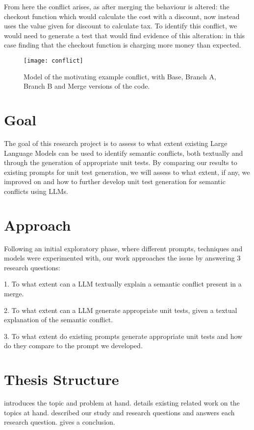 From here the conflict arises, as after merging the behaviour is altered: the checkout function which would calculate the cost with a discount, now instead uses the value given for discount to calculate tax. To identify this conflict, we would need to generate a test that would find evidence of this alteration: in this case finding that the checkout function is charging more money than expected.

\begin{figure}[t]
    \texttt{[image: conflict]}
    \caption{Model of the motivating example conflict, with Base, Branch A, Branch B and Merge versions of the code.}
    \label{fig:conflict}
\end{figure}

\section{Goal} \label{sec:goal}

The goal of this research project is to assess to what extent existing Large Language Models can be used to identify semantic conflicts, both textually and through the generation
of appropriate unit tests. By comparing our results to existing prompts for unit test generation, we will assess to what extent, if any, we improved on and how to further develop
unit test generation for semantic conflicts using LLMs.

\section{Approach} \label{sec:approach}

Following an initial exploratory phase, where different prompts, techniques and models were experimented with, our work approaches the issue by answering
3 research questions:

1. To what extent can a LLM textually explain a semantic conflict present in a merge.

2. To what extent can a LLM generate appropriate unit tests, given a textual explanation of the semantic conflict. 

3. To what extent do existing prompts generate appropriate unit tests and how do they compare to the prompt we developed. 


\section{Thesis Structure} \label{sec:struct}


 introduces the topic and problem at hand.
 details existing related work on the topics at hand.
 described our study and research questions and  answers each research question.
 gives a conclusion.
